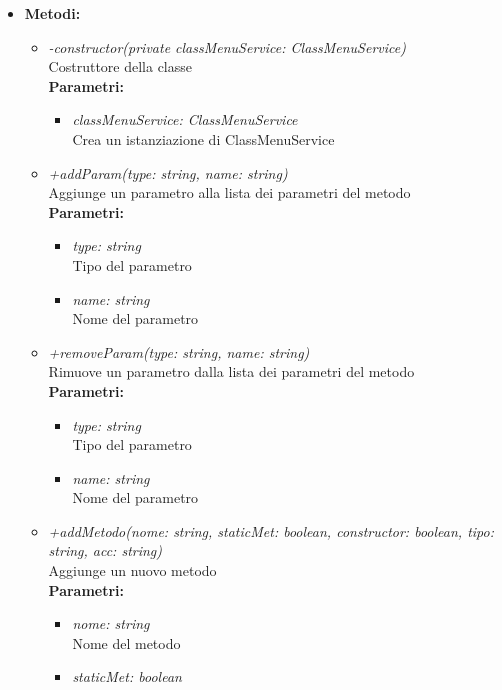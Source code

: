 \begin{itemize}
	\item \textbf{Metodi:}
		\begin{itemize}
			\item \emph{-constructor(private classMenuService: ClassMenuService)}\\
    		Costruttore della classe\\
    		\textbf{Parametri:}
    		\begin{itemize}
    			\item \emph{classMenuService: ClassMenuService}\\
    			Crea un istanziazione di ClassMenuService
    		\end{itemize}
    		\item \emph{+addParam(type: string, name: string)}\\
    		Aggiunge un parametro alla lista dei parametri del metodo\\
    		\textbf{Parametri:}
    		\begin{itemize}
    			\item \emph{type: string}\\
    			Tipo del parametro
    			\item \emph{name: string}\\
    			Nome del parametro
    		\end{itemize}
    		\item \emph{+removeParam(type: string, name: string)}\\
    		Rimuove un parametro dalla lista dei parametri del metodo\\
    		\textbf{Parametri:}
    		\begin{itemize}
    			\item \emph{type: string}\\
    			Tipo del parametro
    			\item \emph{name: string}\\
    			Nome del parametro
    		\end{itemize}
    		\item \emph{+addMetodo(nome: string, staticMet: boolean, constructor: boolean, tipo: string, acc: string)}\\
    		Aggiunge un nuovo metodo\\
    		\textbf{Parametri:}
    		\begin{itemize}
    			\item \emph{nome: string}\\
    			Nome del metodo
    			\item \emph{staticMet: boolean}\\

\end{itemize}
\end{itemize}
\end{itemize}
